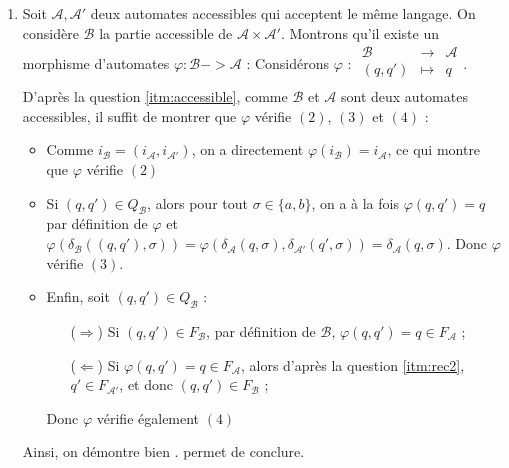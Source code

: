 \documentclass{article}
\begin{document}
\begin{enumerate}
    \item \label{itm:produit} Soit $\mathcal{A}, \mathcal{A}'$ deux automates accessibles qui acceptent le même langage. On considère $\mathcal{B}$ la partie accessible de $\mathcal{A} \times \mathcal{A'}$. \newline
    Montrons qu'il existe un morphisme d'automates $\varphi : \mathcal{B} -> \mathcal{A}$ : \newline
    Considérons $\varphi$ : $\begin{array}{ccc}
        \mathcal{B} & \to & \mathcal{A} \\
        (q, q') & \mapsto & q \\
        \end{array}$. \newline
    D'après la question \ref{itm:accessible}, comme $\mathcal{B}$ et $\mathcal{A}$ sont deux automates accessibles, il suffit de montrer que $\varphi$ vérifie $(2)$, $(3)$ et $(4)$ :
    \begin{itemize}
        \item Comme $i_\mathcal{B} = (i_\mathcal{A}, i_\mathcal{A'})$, on a directement $\varphi(i_\mathcal{B}) = i_\mathcal{A}$, ce qui montre que $\varphi$ vérifie $(2)$
        \item Si $(q, q') \in Q_\mathcal{B}$, alors pour tout $\sigma \in \{a, b \}$, on a à la fois $\varphi(q, q') = q$ par définition de $\varphi$ et $\varphi(\delta_\mathcal{B}((q, q'), \sigma)) = \varphi(\delta_\mathcal{A}(q, \sigma), \delta_\mathcal{A'}(q', \sigma)) = \delta_\mathcal{A}(q, \sigma)$. Donc $\varphi$ vérifie $(3)$.
        \item Enfin, soit $(q, q') \in Q_\mathcal{B}$ : 
            \begin{itemize}
                \item[($\Rightarrow$)] Si $(q, q') \in F_\mathcal{B}$, par définition de $\mathcal{B}$, $\varphi(q, q') = q \in F_\mathcal{A}$ ;
                \item[($\Leftarrow$)] Si $\varphi(q, q') = q \in F_\mathcal{A}$, alors d'après la question \ref{itm:rec2}, $q' \in F_\mathcal{A'}$, et donc $(q, q') \in F_\mathcal{B}$ ; 
            \end{itemize}
            Donc $\varphi$ vérifie également $(4)$
    \end{itemize}
    Ainsi, on démontre bien . \newline
     permet de conclure.
\end{enumerate}
\end{document}
